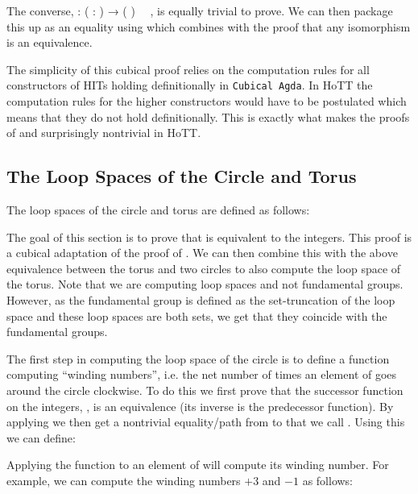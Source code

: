 The converse,  : ( :  
) →  ( ) \ \  , is
equally trivial to prove. We can then package this up as an equality
using  which combines  with the proof that
any isomorphism is an equivalence.
%

The simplicity of this cubical proof relies on the computation rules
for all constructors of HITs holding definitionally in \texttt{Cubical
  Agda}. In HoTT the computation rules for the higher constructors
would have to be postulated which means that they do not hold
definitionally. This is exactly what makes the proofs of
 and  surprisingly nontrivial in HoTT.

\subsection{The Loop Spaces of the Circle and Torus}

The loop spaces of the circle and torus are defined as follows:
%

The goal of this section is to prove that  is equivalent to
the integers. This proof is a cubical adaptation of the proof of
. We can then combine this with the above equivalence
between the torus and two circles to also compute the loop space of
the torus. Note that we are computing loop spaces and not fundamental
groups. However, as the fundamental group is defined as the
set-truncation of the loop space and these loop spaces are both sets,
we get that they coincide with the fundamental groups.

The first step in computing the loop space of the circle is to define
a function computing ``winding numbers'', i.e. the net number of times
an element of  goes around the circle clockwise.
To do this we first prove that the successor function on the integers,
, is an equivalence (its inverse is the predecessor
function). By applying  we then get a nontrivial
equality/path from  to  that we call
. Using this we can define:
%

Applying the  function to an element of  will
compute its winding number. For example, we can compute the winding
numbers $+3$ and $-1$ as follows:
%

